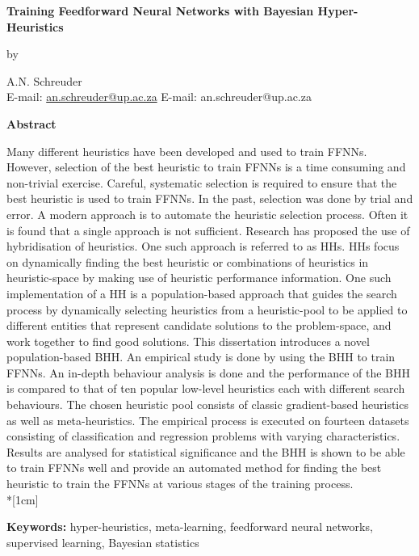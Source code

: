 \pagestyle{empty}

\begin{center}
    \Large
    \textbf{Training Feedforward Neural Networks with Bayesian Hyper-Heuristics}
    \vspace{0.5cm}

    \normalsize
    by
    \vspace{0.5cm}

    \normalsize
    A.N. Schreuder\\
    \ifpdf
        E-mail: \href{mailto:an.schreuder@up.ac.za}{an.schreuder@up.ac.za}
    \else
        E-mail: an.schreuder@up.ac.za
    \fi
    \vspace{1cm}

    \Large
    \textbf{Abstract}
\end{center}
\noindent
Many different heuristics have been developed and used to train \acfp{FFNN}.  However, selection of the best heuristic to train \acp{FFNN} is a time consuming and non-trivial exercise. Careful, systematic selection is required to ensure that the best heuristic is used to train \acp{FFNN}. In the past, selection was done by trial and error. A modern approach is to automate the heuristic selection process. Often it is found that a single approach is not sufficient. Research has proposed the use of hybridisation of heuristics. One such approach is referred to as \acfp{HH}. \acsp{HH} focus on dynamically finding the best heuristic or combinations of heuristics in heuristic-space by making use of heuristic performance information. One such implementation of a \acs{HH} is a population-based approach that guides the search process by dynamically selecting heuristics from a heuristic-pool to be applied to different entities that represent candidate solutions to the problem-space, and work together to find good solutions. This dissertation introduces a novel population-based \Acf{BHH}. An empirical study is done by using the \acs{BHH} to train \acsp{FFNN}. An in-depth behaviour analysis is done and the performance of the \acs{BHH} is compared to that of ten popular low-level heuristics each with different search behaviours. The chosen heuristic pool consists of classic gradient-based heuristics as well as meta-heuristics. The empirical process is executed on fourteen datasets consisting of classification and regression problems with varying characteristics. Results are analysed for statistical significance and the \acs{BHH} is shown to be able to train \acsp{FFNN} well and provide an automated method for finding the best heuristic to train the \acsp{FFNN} at various stages of the training process.\\*[1cm]
\noindent
\parbox{\textwidth}{
    \textbf{Keywords:} hyper-heuristics, meta-learning, feedforward neural networks, supervised learning, Bayesian statistics
}
\vfill
\newpage